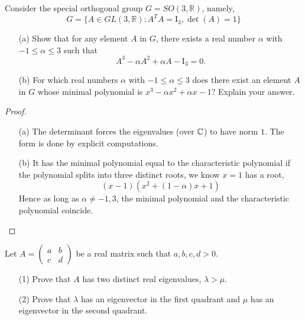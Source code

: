 \begin{prob}[F2011-Q2]
    Consider the special orthogonal group \(G=SO(3,\mathbb{R})\), namely,
    \[G=\{A\in GL(3,\mathbb{R}): A^T A=\mathrm{I}_3, \det(A)=1\}\]
    \begin{itemize}
        \item[(a)] Show that for any element \(A\) in \(G\), there exists a real number \(\alpha\) with \(-1\leq\alpha\leq 3\) such that
        \[A^3-\alpha A^2+\alpha A-\mathrm{I}_3=0.\]
        \item[(b)] For which real numbers \(\alpha\) with \(-1\leq\alpha\leq 3\) does there exist an element \(A\) in \(G\) whose minimal polynomial is \(x^3-\alpha x^2+\alpha x-1\)? Explain your answer.
    \end{itemize}
\end{prob}
\begin{proof}
    \begin{itemize}
        \item[(a)] The determinant forces the eigenvalues (over $\mathbb{C}$) to have norm $1$. The form is done by explicit computations.
        \item[(b)] It has the minimal polynomial equal to the characteristic polynomial if the polynomial splits into three distinct roots, we know $x=1$ has a root, 
        \begin{equation*}
            (x-1)(x^2+(1-\alpha)x+1)
        \end{equation*}
        Hence as long as $\alpha\neq -1,3$, the minimal polynomial and the characteristic polynomial coincide.
    \end{itemize}
\end{proof}


\begin{prob}[F2007-Q3]
    Let \(A = \begin{pmatrix} a & b \\ c & d \end{pmatrix}\) be a real matrix such that \(a,b,c,d > 0\).
    \begin{itemize}
        \item[(1)] Prove that \(A\) has two distinct real eigenvalues, \(\lambda > \mu\).
        \item[(2)] Prove that \(\lambda\) has an eigenvector in the first quadrant and \(\mu\) has an eigenvector in the second quadrant.
    \end{itemize}
\end{prob}







